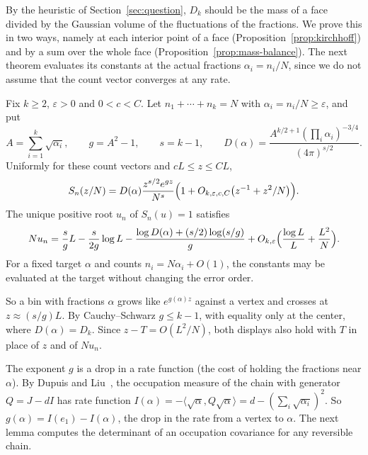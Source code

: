 By the heuristic of Section~\ref{sec:question}, $D_k$ should be the mass of a
face divided by the Gaussian volume of the fluctuations of the fractions. We
prove this in two ways, namely at each interior point of a face
(Proposition~\ref{prop:kirchhoff}) and by a sum over the whole face
(Proposition~\ref{prop:mass-balance}). The next theorem evaluates its constants
at the actual fractions $\alpha_i=n_i/N$, since we do not assume that the count
vector converges at any rate.

\begin{theorem}\label{thm:simplex-interior}
Fix $k\ge2$, $\varepsilon>0$ and $0<c<C$. Let $n_1+\cdots+n_k=N$ with
$\alpha_i=n_i/N\ge\varepsilon$, and put
\[
A=\sum_{i=1}^k\sqrt{\alpha_i},\qquad g=A^2-1,\qquad s=k-1,\qquad
D(\alpha)=\frac{A^{k/2+1}(\prod_i\alpha_i)^{-3/4}}{(4\pi)^{s/2}}.
\]
Uniformly for these count vectors and $cL\le z\le CL$,
\begin{equation}\label{eq:simplex-interior-ratio}
S_n(z/N)=D(\alpha)\frac{z^{s/2}e^{gz}}{N^s}
\Bigl(1+O_{k,\varepsilon,c,C}\bigl(z^{-1}+z^2/N\bigr)\Bigr).
\end{equation}
The unique positive root $u_n$ of $S_n(u)=1$ satisfies
\begin{equation}\label{eq:simplex-interior-root}
Nu_n=\frac sgL-\frac s{2g}\log L
-\frac{\log D(\alpha)+(s/2)\log(s/g)}g
+O_{k,\varepsilon}\Bigl(\frac{\log L}L+\frac{L^2}N\Bigr).
\end{equation}
For a fixed target $\alpha$ and counts $n_i=N\alpha_i+O(1)$, the constants may be
evaluated at the target without changing the error order.
\end{theorem}

So a bin with fractions $\alpha$ grows like $e^{g(\alpha)z}$ against a vertex
and crosses at $z\approx(s/g)L$. By Cauchy--Schwarz $g\le k-1$, with equality
only at the center, where $D(\alpha)=D_k$. Since $z-T=O(L^2/N)$, both displays
also hold with $T$ in place of $z$ and of $Nu_n$.

The exponent $g$ is a drop in a rate function (the cost of holding the
fractions near $\alpha$). By Dupuis and
Liu~\cite[Eq.~(3.2)]{dupuisliu2015}, the occupation measure of the chain with
generator $Q=J-dI$ has rate function
$I(\alpha)=-\langle\sqrt\alpha,Q\sqrt\alpha\rangle=d-(\sum_i\sqrt{\alpha_i})^2$.
So $g(\alpha)=I(e_1)-I(\alpha)$, the drop in the rate from a vertex to
$\alpha$. The next lemma computes the determinant of an occupation covariance for any
reversible chain.

